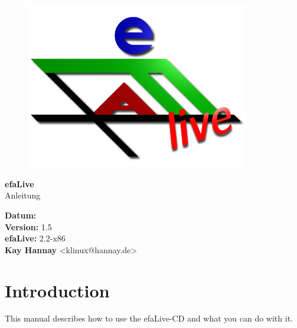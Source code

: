 \documentclass[a4paper,12pt,twoside]{article}
\title{\Title}
\author{\Author}
\date{\DocDate}
\begin{document}

\begin{titlepage}
    \vspace*{1cm}
    \begin{center}
        \begin{figure}
            \centering
            \includegraphics[width=9.745cm,height=7.308cm]{efaLiveen-img/efaLiveen-img1.png}
        \end{figure}
        \Huge
        \textbf{efaLive} \\[0.1cm]
        \LARGE
        Anleitung \\[5cm]
    \end{center}
    \normalsize
    \vspace*{4cm}
    \textbf{Datum:} {\DocDate} \\
    \textbf{Version:} 1.5 \\
    \textbf{efaLive:} 2.2-x86 \\
    \textbf{Kay Hannay} <klinux@hannay.de> \\
\end{titlepage}


\tableofcontents
\clearpage\setcounter{page}{1}
\section{Introduction}
This manual describes how to use the efaLive-CD and what you can do with
it.
\end{document}
